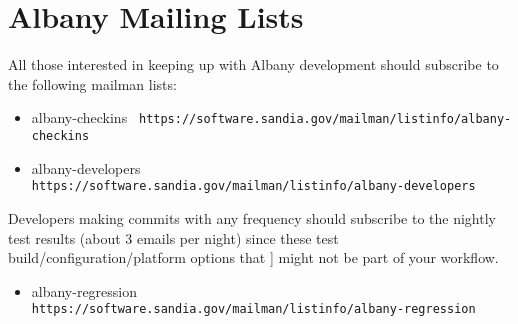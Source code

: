 \documentclass[pdf,12pt,report,strict]{SANDreport}
\theoremstyle{remark}
\begin{document}
\chapter{Albany Mailing Lists}
All those interested in keeping up with Albany development should subscribe
to the following mailman lists:
\begin{itemize}
\item albany-checkins  \texttt{ https://software.sandia.gov/mailman/listinfo/albany-checkins}
\item albany-developers  \texttt{ https://software.sandia.gov/mailman/listinfo/albany-developers}
\end{itemize}
Developers making commits with any frequency should subscribe to the nightly test results
(about 3 emails per night) since these test build/configuration/platform options that ]
might not be part of your workflow.
\begin{itemize}
\item albany-regression  \texttt{ https://software.sandia.gov/mailman/listinfo/albany-regression}
\end{itemize}

%
\clearpage
\providecommand*{\phantomsection}{}
\phantomsection
{}



%

\begin{SANDdistribution}[CA]%

  \SANDdistExternal{}{}
  \bigskip


  \SANDdistInternal{}{}{}{}

  \SANDdistInternalM{}{}{}{}
\end{SANDdistribution}


\end{document}
